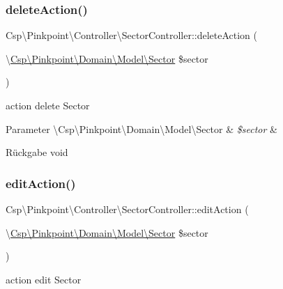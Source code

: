 \subsubsection{\texorpdfstring{delete\+Action()}{deleteAction()}}
{\footnotesize\ttfamily Csp\textbackslash{}\+Pinkpoint\textbackslash{}\+Controller\textbackslash{}\+Sector\+Controller\+::delete\+Action (\begin{DoxyParamCaption}\item[{\textbackslash{}\hyperlink{classCsp_1_1Pinkpoint_1_1Domain_1_1Model_1_1Sector}{Csp\textbackslash{}\+Pinkpoint\textbackslash{}\+Domain\textbackslash{}\+Model\textbackslash{}\+Sector}}]{\$sector }\end{DoxyParamCaption})}

action delete Sector


\begin{DoxyParams}[1]{Parameter}
\textbackslash{}\+Csp\textbackslash{}\+Pinkpoint\textbackslash{}\+Domain\textbackslash{}\+Model\textbackslash{}\+Sector & {\em \$sector} & \\
\hline
\end{DoxyParams}
\begin{DoxyReturn}{Rückgabe}
void 
\end{DoxyReturn}
\mbox{\label{classCsp_1_1Pinkpoint_1_1Controller_1_1SectorController_a602c09943a6795161e7d735e0a3e663f}} 
\subsubsection{\texorpdfstring{edit\+Action()}{editAction()}}
{\footnotesize\ttfamily Csp\textbackslash{}\+Pinkpoint\textbackslash{}\+Controller\textbackslash{}\+Sector\+Controller\+::edit\+Action (\begin{DoxyParamCaption}\item[{\textbackslash{}\hyperlink{classCsp_1_1Pinkpoint_1_1Domain_1_1Model_1_1Sector}{Csp\textbackslash{}\+Pinkpoint\textbackslash{}\+Domain\textbackslash{}\+Model\textbackslash{}\+Sector}}]{\$sector }\end{DoxyParamCaption})}

action edit Sector


